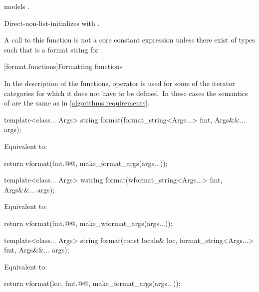 \begin{itemdescr}
\pnum
\constraints
{} models .

\pnum
\effects
Direct-non-list-initializes  with .

\pnum
\remarks
A call to this function is not a core constant expression
unless there exist  of types 
such that  is a format string for .
\end{itemdescr}

[format.functions]{Formatting functions}

\pnum
In the description of the functions, operator \tcode{+} is used
for some of the iterator categories for which it does not have to be defined.
In these cases the semantics of  are
the same as in \ref{algorithms.requirements}.

%
\begin{itemdecl}
template<class... Args>
  string format(format_string<Args...> fmt, Args&&... args);
\end{itemdecl}

\begin{itemdescr}
\pnum
\effects
Equivalent to:
\begin{codeblock}
return vformat(fmt.@@, make_format_args(args...));
\end{codeblock}
\end{itemdescr}

%
\begin{itemdecl}
template<class... Args>
  wstring format(wformat_string<Args...> fmt, Args&&... args);
\end{itemdecl}

\begin{itemdescr}
\pnum
\effects
Equivalent to:
\begin{codeblock}
return vformat(fmt.@@, make_wformat_args(args...));
\end{codeblock}
\end{itemdescr}

%
\begin{itemdecl}
template<class... Args>
  string format(const locale& loc, format_string<Args...> fmt, Args&&... args);
\end{itemdecl}

\begin{itemdescr}
\pnum
\effects
Equivalent to:
\begin{codeblock}
return vformat(loc, fmt.@@, make_format_args(args...));
\end{codeblock}
\end{itemdescr}

